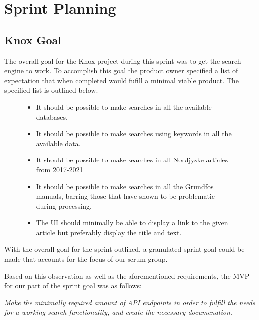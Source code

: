 \section{Sprint Planning}

\subsection{Knox Goal}\label{ssec:sprint3Goal}
The overall goal for the Knox project during this sprint was to get the search engine to work. To accomplish this goal the product owner specified a list of expectation that when completed would fufill a minimal viable product. The specified list is outlined below.
\begin{figure}
\begin{itemize}
	\item It should be possible to make searches in all the available databases.
	\item It should be possible to make searches using keywords in all the available data.
	\item It should be possible to make searches in all Nordjyske articles from 2017-2021
	\item It should be possible to make searches in all the Grundfos manuals, barring those that have shown to be problematic during processing.
	\item The UI should minimally be able to display a link to the given article but preferably display the title and text.
\end{itemize}
\end{figure}
With the overall goal for the sprint outlined, a granulated sprint goal could be made that accounts for the focus of our scrum group.


Based on this observation as well as the aforementioned requirements, the MVP for our part of the sprint goal was as follows:
\vspace{\baselineskip}

\textit{Make the minimally required amount of API endpoints in order to fulfill the needs for a working search functionality, and create the necessary documenation.}


